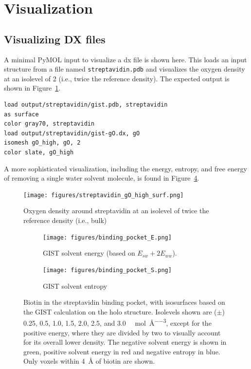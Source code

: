 \documentclass[9pt,tutorial]{livecoms}
\newcommand\inlinecode{\texttt}
\begin{document}
\section{Visualization}
\label{sec:visualization}
\subsection{Visualizing DX files}
A minimal PyMOL input to visualize a dx file is shown here.
This loads an input structure from a file named \inlinecode{streptavidin.pdb} and visualizes the oxygen density at an isolevel of 2 (i.e., twice the reference density).
The expected output is shown in Figure~\ref{fig-streptavidin_gO}.

\begin{lstlisting}[style=pymol]
load output/streptavidin/gist.pdb, streptavidin
as surface
color gray70, streptavidin
load output/streptavidin/gist-gO.dx, gO
isomesh gO_high, gO, 2
color slate, gO_high
\end{lstlisting}
A more sophisticated visualization, including the energy, entropy, and free energy of removing a single water solvent 
molecule, is found in Figure~\ref{fig-binding-pocket}.
\begin{figure}
	\centering
	\texttt{[image: figures/streptavidin\_gO\_high\_surf.png]}
	\caption{Oxygen density around streptavidin at an isolevel of twice the reference density (i.e., bulk)}
	\label{fig-streptavidin_gO}
\end{figure}
\begin{figure}
	\centering
	\begin{subfigure}[b]{0.45\textwidth}
	\texttt{[image: figures/binding\_pocket\_E.png]}
	\caption{GIST solvent energy (based on $E_{sw} + 2E_{ww}$).}
	\label{fig-binding-pocket-energy}
    \end{subfigure}
	\hfill
	\begin{subfigure}[b]{0.45\textwidth}
		\texttt{[image: figures/binding\_pocket\_S.png]}
		\caption{GIST solvent entropy}
		\label{fig-binding-pocket-entropy}
	\end{subfigure}
	\caption{Biotin in the streptavidin binding pocket, with isosurfaces based on the GIST calculation on the holo structure. 
	Isolevels shown are ($\pm$) 0.25, 0.5, 1.0, 1.5, 2.0, 2.5, and 3.0 \si{\kilo\calorie\per\mole\per\cubic\angstrom}, except for 
	the positive energy, where they are divided by two to visually account for its overall lower density. The negative solvent energy is shown in green, positive solvent energy in red and negative entropy in blue. Only voxels within \SI{4}{\angstrom} of biotin are shown.}
	\label{fig-binding-pocket}
\end{figure}
\end{document}
